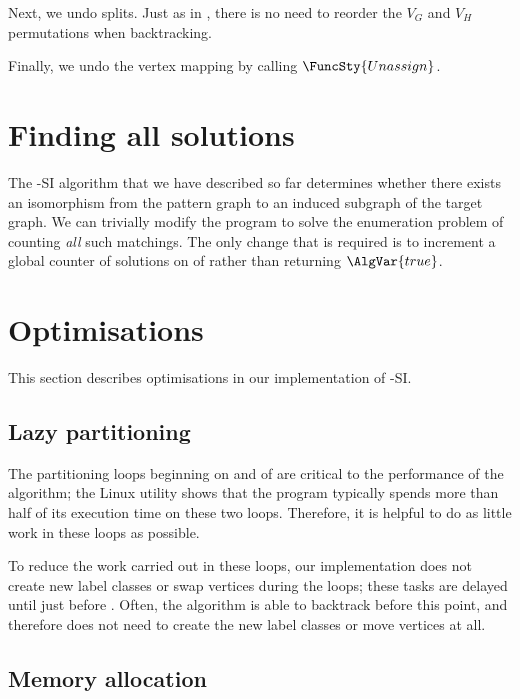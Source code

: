 Next, we undo splits.  Just as in \McSplit, there is
no need to reorder the $V_G$ and $V_H$ permutations when backtracking.

Finally, we undo the vertex mapping by calling $\FuncSty{Unassign}$.

\FloatBarrier

\section{Finding all solutions}

The \McSplit-SI algorithm that we have described so far determines whether there
exists an isomorphism from the pattern graph to an induced subgraph of the target
graph.  We can trivially modify the program to solve the enumeration problem
of counting \emph{all} such matchings.  The only change that is required is
to increment a global counter of solutions on
 of \label{McSplitSIAlg} rather than returning
$\AlgVar{true}$.

\section{Optimisations}

This section describes optimisations in our implementation of \McSplit-SI.

\subsection{Lazy partitioning}\label{subsec:lazy-partitioning}

The partitioning loops beginning on 
and  of  are critical to
the performance of the algorithm; the Linux  utility shows
that the program typically spends more than half of its execution time
on these two loops.  Therefore, it is helpful to do as little work in these
loops as possible.

To reduce the work carried out in these loops, our implementation does
not create new label classes or swap vertices during the loops; these
tasks are delayed until just before .  Often,
the algorithm is able to backtrack before this point, and therefore does
not need to create the new label classes or move vertices at all.

\subsection{Memory allocation}

